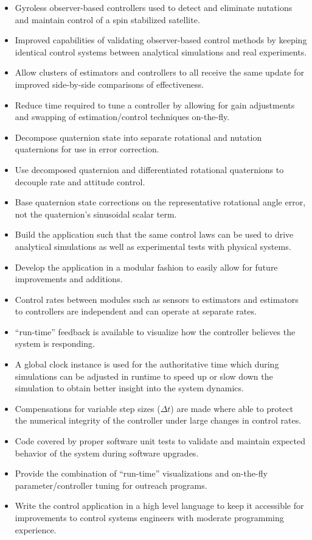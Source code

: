\begin{itemize}
\item Gyroless observer-based controllers used to detect and eliminate nutations and maintain control of a spin stabilized satellite.
\item Improved capabilities of validating observer-based control methods by keeping identical control systems between analytical simulations and real experiments.
\item Allow clusters of estimators and controllers to all receive the same update for improved side-by-side comparisons of effectiveness.
\item Reduce time required to tune a controller by allowing for gain adjustments and swapping of estimation/control techniques on-the-fly.
\item Decompose quaternion state into separate rotational and nutation quaternions for use in error correction.
\item Use decomposed quaternion and differentiated rotational quaternions to decouple rate and attitude control.
\item Base quaternion state corrections on the representative rotational angle error, not the quaternion's sinusoidal scalar term.
\item Build the application such that the same control laws can be used to drive analytical simulations as well as experimental tests with physical systems.
\item Develop the application in a modular fashion to easily allow for future improvements and additions.
\item Control rates between modules such as sensors to estimators and estimators to controllers are independent and can operate at separate rates.
\item ``run-time'' feedback is available to visualize how the controller believes the system is responding.
\item A global clock instance is used for the authoritative time which during simulations can be adjusted in runtime to speed up or slow down the simulation to obtain better insight into the system dynamics.
\item Compensations for variable step sizes ($\Delta t$) are made where able to protect the numerical integrity of the controller under large changes in control rates.
\item Code covered by proper software unit tests to validate and maintain expected behavior of the system during software upgrades.
\item Provide the combination of ``run-time'' visualizations and on-the-fly parameter/controller tuning for outreach programs.
\item Write the control application in a high level language to keep it accessible for improvements to control systems engineers with moderate programming experience.
\end{itemize}

